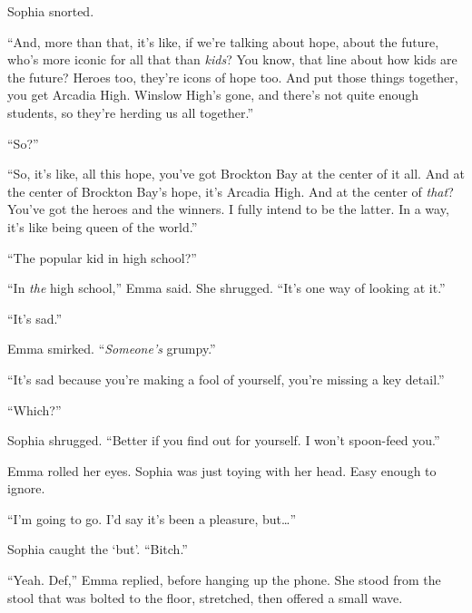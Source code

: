 Sophia snorted.



``And, more than that, it's like, if we're talking about hope, about the future, who's more iconic for all that than \emph{kids}?  You know, that line about how kids are the future?  Heroes too, they're icons of hope too.  And put those things together, you get Arcadia High.  Winslow High's gone, and there's not quite enough students, so they're herding us all together.''



``So?''



``So, it's like, all this hope, you've got Brockton Bay at the center of it all.  And at the center of Brockton Bay's hope, it's Arcadia High.  And at the center of \emph{that}?  You've got the heroes and the winners.  I fully intend to be the latter.  In a way, it's like being queen of the world.''



``The popular kid in high school?''



``In \emph{the} high school,'' Emma said.  She shrugged.  ``It's one way of looking at it.''



``It's sad.''



Emma smirked.  ``\emph{Someone's }grumpy.''



``It's sad because you're making a fool of yourself, you're missing a key detail.''



``Which?''



Sophia shrugged.  ``Better if you find out for yourself.  I won't spoon-feed you.''



Emma rolled her eyes.  Sophia was just toying with her head.  Easy enough to ignore.



``I'm going to go.  I'd say it's been a pleasure, but\ldots''



Sophia caught the `but'.  ``Bitch.''



``Yeah.  Def,'' Emma replied, before hanging up the phone.  She stood from the stool that was bolted to the floor, stretched, then offered a small wave.



